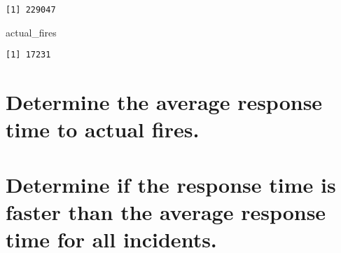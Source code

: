 \documentclass[
  letterpaper,
  DIV=11,
  numbers=noendperiod]{scrartcl}
\newenvironment{Shaded}{\begin{snugshade}}{\end{snugshade}}
\newcommand{\NormalTok}[1]{\textcolor[rgb]{0.00,0.23,0.31}{#1}}
\begin{document}
\begin{verbatim}
[1] 229047
\end{verbatim}

\begin{Shaded}
\begin{Highlighting}[]
\NormalTok{actual\_fires}
\end{Highlighting}
\end{Shaded}

\begin{verbatim}
[1] 17231
\end{verbatim}

\section{Determine the average response time to actual
fires.}\label{determine-the-average-response-time-to-actual-fires.}

\section{Determine if the response time is faster than the average
response time for all
incidents.}\label{determine-if-the-response-time-is-faster-than-the-average-response-time-for-all-incidents.}
\end{document}
